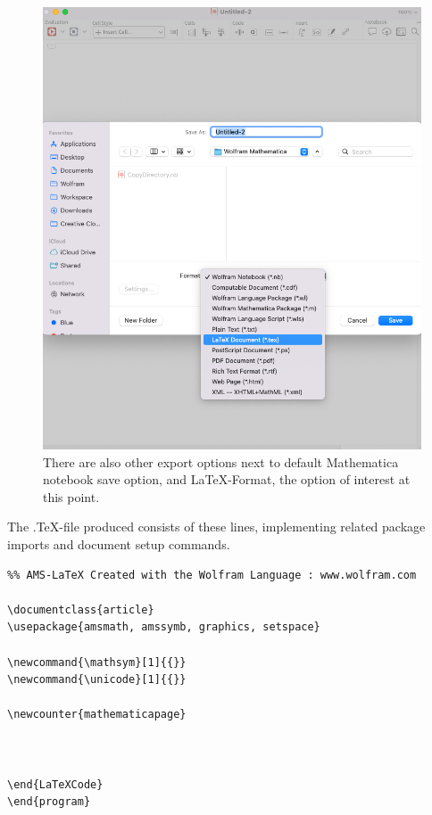 \begin{figure}[h]
    \centering
    \includegraphics[scale=0.3]{images/introduction/MM-to-latex.png}
    \caption{There are also other export options next to default Mathematica notebook save option, and \LaTeX-Format, the option of interest at this point.}
    \label{fig:MM-to-latex}
\end{figure}

The .TeX-file produced consists of these lines, implementing related package imports and document setup commands.

\begin{verbatim}
%% AMS-LaTeX Created with the Wolfram Language : www.wolfram.com

\documentclass{article}
\usepackage{amsmath, amssymb, graphics, setspace}

\newcommand{\mathsym}[1]{{}}
\newcommand{\unicode}[1]{{}}

\newcounter{mathematicapage}



\end{LaTeXCode}
\end{program}
\end{verbatim}

